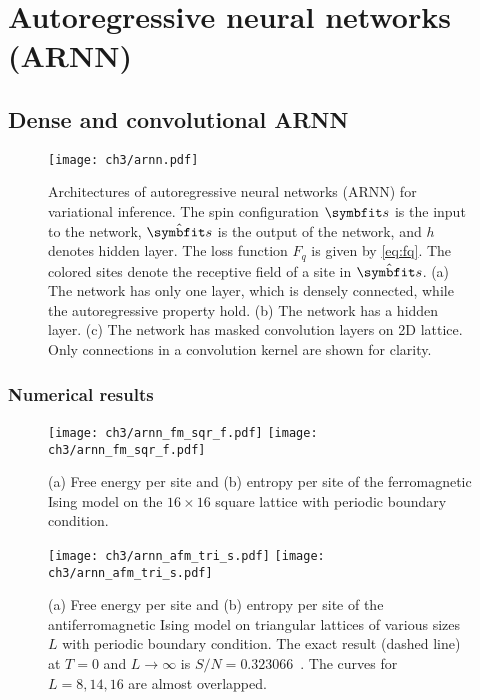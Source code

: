 \chapter{Autoregressive neural networks (ARNN)}
\label{sec:arnn}

\section{Dense and convolutional ARNN}

\cite{wu2019solving}

\cite{nicoli2020asymptotically}

\cite{ciarella2023machine}

\begin{figure}[htb]
\centering
\texttt{[image: ch3/arnn.pdf]}
\caption[Architectures of autoregressive neural networks for variational inference]{
Architectures of autoregressive neural networks (ARNN) for variational inference.
The spin configuration $\vs$ is the input to the network, $\hat{\vs}$ is the output of the network, and $h$ denotes hidden layer. The loss function $F_q$ is given by \cref{eq:fq}. The colored sites denote the receptive field of a site in $\hat{\vs}$.
(a) The network has only one layer, which is densely connected, while the autoregressive property hold.
(b) The network has a hidden layer.
(c) The network has masked convolution layers on 2D lattice. Only connections in a convolution kernel are shown for clarity.
}
\label{fig:arnn}
\end{figure}

\subsection{Numerical results}

\begin{figure}[htb]
\centering
\texttt{[image: ch3/arnn\_fm\_sqr\_f.pdf]}
\texttt{[image: ch3/arnn\_fm\_sqr\_f.pdf]}
\caption[ARNN results of Ising model on square lattice]{
(a) Free energy per site and (b) entropy per site of the ferromagnetic Ising model on the $16 \times 16$ square lattice with periodic boundary condition.
}
\label{fig:arnn-sqr}
\end{figure}

\begin{figure}[htb]
\centering
\texttt{[image: ch3/arnn\_afm\_tri\_s.pdf]}
\texttt{[image: ch3/arnn\_afm\_tri\_s.pdf]}
\caption[ARNN results of Ising model on triangular lattice]{
(a) Free energy per site and (b) entropy per site of the antiferromagnetic Ising model on triangular lattices of various sizes $L$ with periodic boundary condition.
The exact result (dashed line) at $T = 0$ and $L \to \infty$ is $S / N = 0.323066$~\cite{TODO}. The curves for $L = 8, 14, 16$ are almost overlapped.
}
\label{fig:arnn-tri}
\end{figure}

